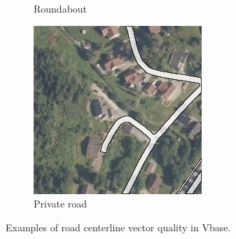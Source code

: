 \begin{figure}[h]
\begin{subfigure}{0.31\textwidth}
\caption{Roundabout} \label{fig:norwegian_roads_roundabout_vbase}
\end{subfigure}
\hspace*{\fill} %
\begin{subfigure}{0.31\textwidth}
\includegraphics[width=\linewidth]{figs/datasets/nor_examples/1157_missing_vbase.png}
\caption{Private road} \label{fig:norwegian_roads_missing_vbase}
\end{subfigure}
\hspace*{\fill} %
\caption[Road centerline vector quality of Vbase]{Examples of road centerline vector quality in Vbase.} \label{fig:norwegian_roads_examples_vbase}
\end{figure}

